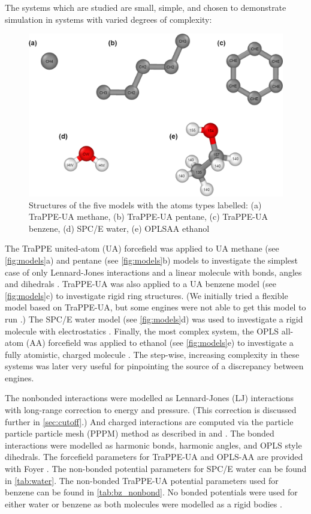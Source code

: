 The systems which are studied are small, simple, and chosen to demonstrate simulation in systems with varied degrees of complexity:
\begin{figure}[h!]
    \centering
    \includegraphics[width=\linewidth]{figures/rep_study/models.png}
    \caption{Structures of the five models with the atoms types labelled: (a) TraPPE-UA methane, (b) TraPPE-UA pentane, (c) TraPPE-UA benzene, (d) SPC/E water, (e) OPLSAA ethanol}\label{fig:models}
\end{figure}
The TraPPE united-atom (UA) forcefield was applied to UA methane (see \autoref{fig:models}a) and pentane (see \autoref{fig:models}b) models to investigate the simplest case of only Lennard-Jones interactions and a linear molecule with bonds, angles and dihedrals \citep{Martin1998}.
TraPPE-UA was also applied to a UA benzene model (see \autoref{fig:models}c) to investigate rigid ring structures.
(We initially tried a flexible model based on TraPPE-UA, but some engines were not able to get this model to run \citep{Yiannourakou2019}.)
The SPC/E water model (see \autoref{fig:models}d) was used to investigate a rigid molecule with electrostatics \citep{Berendsen1987a}.
Finally, the most complex system, the OPLS all-atom (AA) forcefield was applied to ethanol (see \autoref{fig:models}e) to investigate a fully atomistic, charged molecule \citep{Jorgensen1988}.
The step-wise, increasing complexity in these systems was later very useful for pinpointing the source of a discrepancy between engines.

The nonbonded interactions were modelled as Lennard-Jones (LJ) interactions with long-range correction to energy and pressure. (This correction is discussed further in \autoref{sec:cutoff}.)
And charged interactions are computed via the particle particle particle mesh (PPPM) method as described in \citet{Darden1993} and \citet{Lebard2012}. 
The bonded interactions were modelled as harmonic bonds, harmonic angles, and OPLS style dihedrals.
The forcefield parameters for TraPPE-UA and OPLS-AA are provided with Foyer \citep{foyer}. 
The non-bonded potential parameters for SPC/E water can be found in \autoref{tab:water}. 
The non-bonded TraPPE-UA potential parameters used for benzene can be found in \autoref{tab:bz_nonbond}. No bonded potentials were used for either water or benzene as both molecules were modelled as a rigid bodies \citep{Nguyen2011a, Glaser2020a}. 

